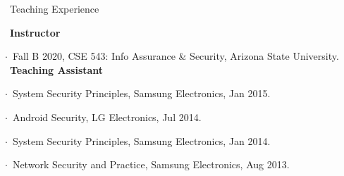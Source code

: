\documentclass{resume} %
\begin{document}
\begin{rSection}{\faGenderless~Teaching Experience}

    \textbullet~{\bf Instructor} \\
        \strut\hspace{1cm}$\cdot$~Fall B 2020, CSE 543: Info Assurance \& Security, Arizona State University.\\

	\textbullet~{\bf Teaching Assistant} \\
		\strut\hspace{1cm}$\cdot$~System Security Principles, Samsung Electronics, Jan 2015.\\
		\strut\hspace{1cm}$\cdot$~Android Security, LG Electronics, Jul 2014.\\
		\strut\hspace{1cm}$\cdot$~System Security Principles, Samsung Electronics, Jan 2014.\\
		\strut\hspace{1cm}$\cdot$~Network Security and Practice, Samsung Electronics, Aug 2013.

	\vspace{3mm}
\end{rSection}	

%






\end{document}
